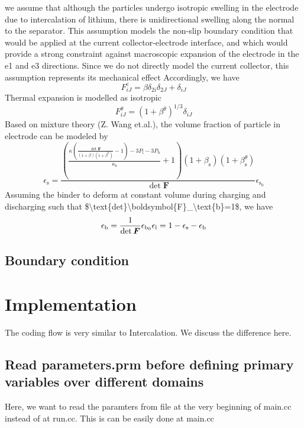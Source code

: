 we assume that although the particles undergo isotropic swelling in the electrode due to intercalation of lithium, there is unidirectional swelling along the normal to the separator. This assumption models the non-\/slip boundary condition that would be applied at the current collector-\/electrode interface, and which would provide a strong constraint against macroscopic expansion of the electrode in the e1 and e3 directions. Since we do not directly model the current collector, this assumption represents its mechanical effect Accordingly, we have \[ F^\text{c}_{iJ}=\beta\delta_{2i}\delta_{2J}+\delta_{iJ} \] Thermal expansion is modelled as isotropic \[ F^{\theta}_{iJ}=(1+\beta^{\theta})^{1/3}\delta_{iJ} \] Based on mixture theory (Z. Wang et.\+al.), the volume fraction of particle in electrode can be modeled by \[ \epsilon_\text{s}=\frac{\left( \frac{\kappa(\frac{\det\boldsymbol{F}}{(1+\beta)(1+\beta^\theta)}-1)-3P_\text{l}-3P_\text{b}}{\kappa_\text{s}} +1\right)(1+\beta_\text{s})(1+\beta_\text{s}^\theta)}{\det\boldsymbol{F}}\epsilon_{\text{s}_0} \] Assuming the binder to deform at constant volume during charging and discharging such that \$\textbackslash{}text\{det\}\textbackslash{}boldsymbol\{F\}\+\_\+\textbackslash{}text\{b\}=1\$, we have \[ \epsilon_\text{b}=\frac{1}{\det \boldsymbol{F}}\epsilon_{\text{b}_0}\\ \epsilon_\text{l}=1-\epsilon_{\text{s}}-\epsilon_\text{b} \] \hypertarget{battery_electrode_scale_sub2}{}\subsection{Boundary condition}\label{battery_electrode_scale_sub2}
 \hypertarget{battery_particle_Implementation}{}\section{Implementation}\label{battery_particle_Implementation}
The coding flow is very similar to Intercalation. We discuss the difference here.\hypertarget{battery_electrode_scale_sub1}{}\subsection{Read parameters.\+prm before defining primary variables over different domains}\label{battery_electrode_scale_sub1}
Here, we want to read the paramters from file at the very beginning of main.\+cc instead of at run.\+cc. This is can be easily done at main.\+cc 
\begin{DoxyCode}{0}
\end{DoxyCode}
